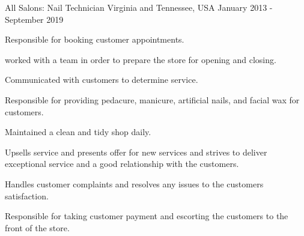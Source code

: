 

\begin{cventries}

  \cventry
  {All Salons:}
  {Nail Technician}
  {Virginia and Tennessee, USA}
  {January 2013 - September 2019}
  {
  \begin{cvitems}
      \item Responsible for booking customer appointments.
      \item worked with a team in order to prepare the store for opening and closing.
      \item Communicated with customers to determine service.
      \item Responsible for providing pedacure, manicure, artificial nails, and facial wax for customers.
      \item Maintained a clean and tidy shop daily.
       \item Upsells service and presents offer for new services and strives to deliver exceptional service and a good relationship with the customers.
      \item Handles customer complaints and resolves any issues to the customers satisfaction.
      \item Responsible for taking customer payment and escorting the customers to the front of the store.
  \end{cvitems}
  }


\end{cventries}
